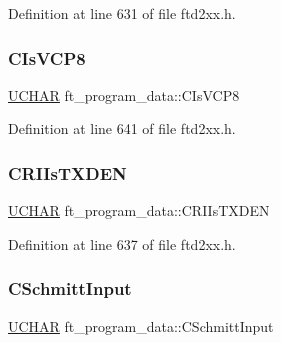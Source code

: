 Definition at line 631 of file ftd2xx.\+h.

\mbox{\label{structft__program__data_ae07ed81a5c26a3288d28e6a77ed3a76a}} 
\subsubsection{\texorpdfstring{C\+Is\+V\+C\+P8}{CIsVCP8}}
{\footnotesize\ttfamily \hyperlink{CatCaloProto40MHz_2inc_2WinTypes_8h_a4f4bb67531a9bf6f0b9c6ad76aeba587}{U\+C\+H\+AR} ft\+\_\+program\+\_\+data\+::\+C\+Is\+V\+C\+P8}



Definition at line 641 of file ftd2xx.\+h.

\mbox{\label{structft__program__data_a5bb9db57af04d2f404272c8e6c2a59f6}} 
\subsubsection{\texorpdfstring{C\+R\+I\+Is\+T\+X\+D\+EN}{CRIIsTXDEN}}
{\footnotesize\ttfamily \hyperlink{CatCaloProto40MHz_2inc_2WinTypes_8h_a4f4bb67531a9bf6f0b9c6ad76aeba587}{U\+C\+H\+AR} ft\+\_\+program\+\_\+data\+::\+C\+R\+I\+Is\+T\+X\+D\+EN}



Definition at line 637 of file ftd2xx.\+h.

\mbox{\label{structft__program__data_a7e78dd68e42bbbcff1000bcbce8a3d0d}} 
\subsubsection{\texorpdfstring{C\+Schmitt\+Input}{CSchmittInput}}
{\footnotesize\ttfamily \hyperlink{CatCaloProto40MHz_2inc_2WinTypes_8h_a4f4bb67531a9bf6f0b9c6ad76aeba587}{U\+C\+H\+AR} ft\+\_\+program\+\_\+data\+::\+C\+Schmitt\+Input}



